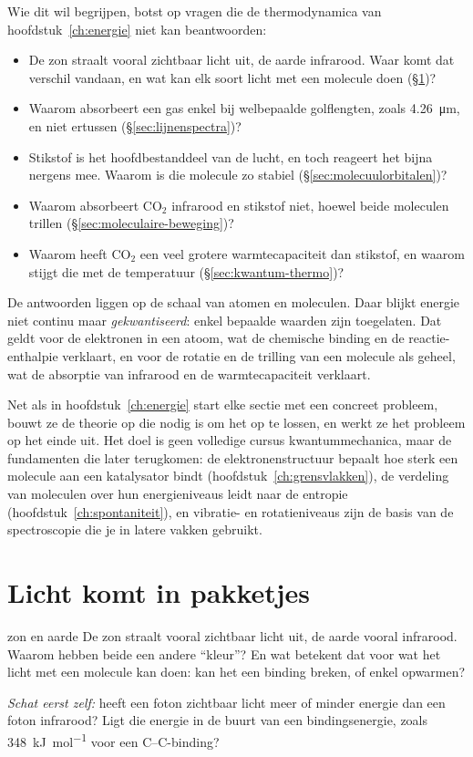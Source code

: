 Wie dit wil begrijpen, botst op vragen die de thermodynamica van hoofdstuk~\ref{ch:energie} niet kan beantwoorden:
\begin{itemize}
\item De zon straalt vooral zichtbaar licht uit, de aarde infrarood. Waar komt dat verschil vandaan, en wat kan elk soort licht met een molecule doen (\S\ref{sec:licht-pakketjes})?
\item Waarom absorbeert een gas enkel bij welbepaalde golflengten, zoals \SI{4.26}{\micro\metre}, en niet ertussen (\S\ref{sec:lijnenspectra})?
\item Stikstof is het hoofdbestanddeel van de lucht, en toch reageert het bijna nergens mee. Waarom is die molecule zo stabiel (\S\ref{sec:molecuulorbitalen})?
\item Waarom absorbeert CO$_2$ infrarood en stikstof niet, hoewel beide moleculen trillen (\S\ref{sec:moleculaire-beweging})?
\item Waarom heeft CO$_2$ een veel grotere warmtecapaciteit dan stikstof, en waarom stijgt die met de temperatuur (\S\ref{sec:kwantum-thermo})?
\end{itemize}
De antwoorden liggen op de schaal van atomen en moleculen. Daar blijkt energie niet continu maar \emph{gekwantiseerd}: enkel bepaalde waarden zijn toegelaten. Dat geldt voor de elektronen in een atoom, wat de chemische binding en de reactie-enthalpie verklaart, en voor de rotatie en de trilling van een molecule als geheel, wat de absorptie van infrarood en de warmtecapaciteit verklaart.

Net als in hoofdstuk~\ref{ch:energie} start elke sectie met een concreet probleem, bouwt ze de theorie op die nodig is om het op te lossen, en werkt ze het probleem op het einde uit. Het doel is geen volledige cursus kwantummechanica, maar de fundamenten die later terugkomen: de elektronenstructuur bepaalt hoe sterk een molecule aan een katalysator bindt (hoofdstuk~\ref{ch:grensvlakken}), de verdeling van moleculen over hun energieniveaus leidt naar de entropie (hoofdstuk~\ref{ch:spontaniteit}), en vibratie- en rotatieniveaus zijn de basis van de spectroscopie die je in latere vakken gebruikt.

\section{Licht komt in pakketjes}
\label{sec:licht-pakketjes}

\begin{casus}{zon en aarde}
De zon straalt vooral zichtbaar licht uit, de aarde vooral infrarood. Waarom hebben beide een andere ``kleur''? En wat betekent dat voor wat het licht met een molecule kan doen: kan het een binding breken, of enkel opwarmen?

\emph{Schat eerst zelf:} heeft een foton zichtbaar licht meer of minder energie dan een foton infrarood? Ligt die energie in de buurt van een bindingsenergie, zoals \SI{348}{\kilo\joule\per\mole} voor een C--C-binding?
\end{casus}

